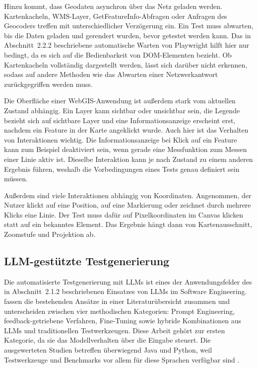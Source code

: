 Hinzu kommt, dass Geodaten asynchron über das Netz geladen werden. Kartenkacheln, \ac{WMS}-Layer, GetFeatureInfo-Abfragen oder Anfragen des Geocoders treffen mit unterschiedlicher Verzögerung ein. Ein Test muss abwarten, bis die Daten geladen und gerendert wurden, bevor getestet werden kann. Das in Abschnitt~2.2.2 beschriebene automatische Warten von Playwright hilft hier nur bedingt, da es sich auf die Bedienbarkeit von \ac{DOM}-Elementen bezieht. Ob Kartenkacheln vollständig dargestellt werden, lässt sich darüber nicht erkennen, sodass auf andere Methoden wie das Abwarten einer Netzwerkantwort zurückgegriffen werden muss.

Die Oberfläche einer WebGIS-Anwendung ist außerdem stark vom aktuellen Zustand abhängig. Ein Layer kann sichtbar oder unsichtbar sein, die Legende bezieht sich auf sichtbare Layer und eine Informationsanzeige erscheint erst, nachdem ein Feature in der Karte angeklickt wurde. Auch hier ist das Verhalten von Interaktionen wichtig. Die Informationsanzeige bei Klick auf ein Feature kann zum Beispiel deaktiviert sein, wenn gerade eine Messfunktion zum Messen einer Linie aktiv ist. Dieselbe Interaktion kann je nach Zustand zu einem anderen Ergebnis führen, weshalb die Vorbedingungen eines Tests genau definiert sein müssen.

Außerdem sind viele Interaktionen abhängig von Koordinaten. Angenommen, der Nutzer klickt auf eine Position, auf eine Markierung oder zeichnet durch mehrere Klicks eine Linie. Der Test muss dafür auf Pixelkoordinaten im Canvas klicken statt auf ein bekanntes Element. Das Ergebnis hängt dann von Kartenausschnitt, Zoomstufe und Projektion ab.

\subsection{LLM-gestützte Testgenerierung}

Die automatisierte Testgenerierung mit \acp{LLM} ist eines der Anwendungsfelder des in Abschnitt~2.1.2 beschriebenen Einsatzes von \acp{LLM} im Software Engineering. \textcite[S.~7f]{celik_review_2025} fassen die bestehenden Ansätze in einer Literaturübersicht zusammen und unterscheiden zwischen vier methodischen Kategorien: Prompt Engineering, feedback-getriebene Verfahren, Fine-Tuning sowie hybride Kombinationen aus \acp{LLM} und traditionellen Testwerkzeugen. Diese Arbeit gehört zur ersten Kategorie, da sie das Modellverhalten über die Eingabe steuert. Die ausgewerteten Studien betreffen überwiegend Java und Python, weil Testwerkzeuge und Benchmarks vor allem für diese Sprachen verfügbar sind \parencite[S.~21]{celik_review_2025}.

